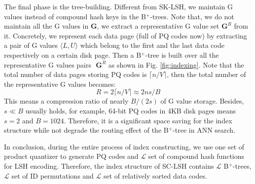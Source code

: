 \documentclass[twocolumn]{svjour3}          %
\begin{document}
The final phase is the tree-building. Different from SK-LSH, we maintain G values instead of compound hash keys in the B$^+$-trees. Note that, we do not maintain all the G values in $\textbf{G}$, we extract a representative G value set $\textbf{G}^R$ from it. Concretely, we represent each data page (full of PQ codes now) by extracting a pair of G values $\langle L, U \rangle$ which belong to the first and the last data code respectively on a certain disk page. Then a B$^+$-tree is built over all the representative G values pairs $\textbf{	G}^R$ as shown in Fig. \ref{fig:indexing}. Note that the total number of data pages storing PQ codes is $\lceil n/V \rceil$, then the total number of the representative G values becomes:
\begin{equation}\label{eq:nrepg}
R = 2\lceil n/V \rceil \approx 2ns/B
\end{equation}
This means a compression ratio of nearly ${B}/{(2s)}$ of G value storage. Besides, $s \ll B$ usually holds, for example, 64-bit PQ codes in 4KB disk pages means $s=2$ and $B=1024$. Therefore, it is a significant space saving for the index structure while not degrade the routing effect of the B$^+$-tree in ANN search.

In conclusion, during the entire process of index constructing, we use one set of product quantizer to generate PQ codes and $\mathcal{L}$ set of compound hash functions for LSH encoding. Therefore, the index structure of SC-LSH contains $\mathcal{L}$ B$^{+}$-trees, $\mathcal{L}$ set of ID permutations and $\mathcal{L}$ set of relatively sorted data codes.
\end{document}
